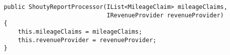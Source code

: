 \begin{verbatim}
    public ShoutyReportProcessor(IList<MileageClaim> mileageClaims, 
                                 IRevenueProvider revenueProvider)
    {
        this.mileageClaims = mileageClaims;
        this.revenueProvider = revenueProvider;
    }
\end{verbatim}